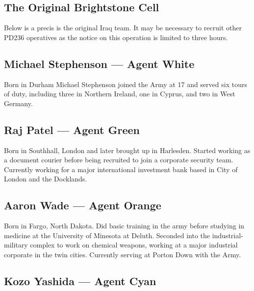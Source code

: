 \documentclass{amsart}
\begin{document}
\begin{multicols}{3}
\section{The Original Brightstone Cell}

Below is a precis is the original Iraq team.  It may be necessary
to recruit other PD236 operatives as the notice on this operation
is limited to three hours.



\subsection{Michael Stephenson --- Agent White}

Born in Durham Michael Stephenson joined the Army at 17 and served six
tours of duty, including three in Northern Ireland, one in Cyprus, and
two in West Germany.


\subsection{Raj Patel --- Agent Green}

Born in Southhall, London and later brought up in Harlesden.  Started
working as a document courier before being recruited to join a
corporate security team.  Currently working for a major international
investment bank based in City of London and the Docklands.


\subsection{Aaron Wade --- Agent Orange}

Born in Fargo, North Dakota.  Did basic training in the army before
studying in medicine at the University of Minesota at Deluth.
Seconded into the industrial-military complex to work on chemical
weapons, working at a major industrial corporate in the twin cities.
Currently serving at Porton Down with the Army.


\subsection{Kozo Yashida --- Agent Cyan}


\end{multicols}
\end{document}
